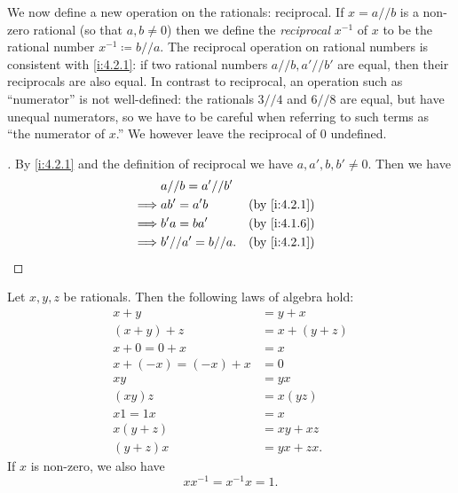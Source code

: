 \begin{ac}\label{i:ac:4.2.3}
  We now define a new operation on the rationals: reciprocal.
  If \(x = a // b\) is a non-zero rational (so that \(a, b \neq 0\)) then we define the \emph{reciprocal} \(x^{-1}\) of \(x\) to be the rational number \(x^{-1} \coloneqq b // a\).
  The reciprocal operation on rational numbers is consistent with \cref{i:4.2.1}:
  if two rational numbers \(a // b, a' // b'\) are equal, then their reciprocals are also equal.
  In contrast to reciprocal, an operation such as ``numerator'' is not well-defined:
  the rationals \(3 // 4\) and \(6 // 8\) are equal, but have unequal numerators, so we have to be careful when referring to such terms as ``the numerator of \(x\).''
  We however leave the reciprocal of \(0\) undefined.
\end{ac}

\begin{proof}[]
  By \cref{i:4.2.1} and the definition of reciprocal we have \(a, a', b, b' \neq 0\).
  Then we have
  \begin{align*}
             & a // b = a' // b'                    \\
    \implies & ab' = a'b          &  & \by{i:4.2.1} \\
    \implies & b'a = ba'          &  & \by{i:4.1.6} \\
    \implies & b' // a' = b // a. &  & \by{i:4.2.1}
  \end{align*}
\end{proof}

\begin{prop}\label{i:4.2.4}
  Let \(x, y, z\) be rationals.
  Then the following laws of algebra hold:
  \begin{align*}
    x + y               & = y + x       \\
    (x + y) + z         & = x + (y + z) \\
    x + 0 = 0 + x       & = x           \\
    x + (-x) = (-x) + x & = 0           \\
    xy                  & = yx          \\
    (xy)z               & = x(yz)       \\
    x1 = 1x             & = x           \\
    x(y + z)            & = xy + xz     \\
    (y + z)x            & = yx + zx.
  \end{align*}
  If \(x\) is non-zero, we also have
  \[
    xx^{-1} = x^{-1}x = 1.
  \]
\end{prop}


